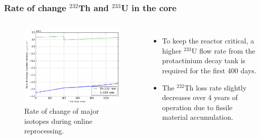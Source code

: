 \begin{frame}
  \frametitle{Rate of change $^{232}$Th and $^{233}$U in the core}
    \begin{columns}
    \column[t]{7.5cm}
   \vspace{-0.35in}
  \begin{figure}[t]
   \includegraphics[height=0.75\textheight]{./images/rates_fuel.png}
   \vspace{-0.05in}
   \caption{Rate of change of major isotopes during online reprocessing.}
    \end{figure}

    \column[t]{4.5cm}
       \begin{itemize}
        \item To keep the reactor critical, a higher $^{233}$U flow rate from the protactinium decay tank is required for
the first 400 days.
        \item The $^{232}$Th loss rate slightly decreases over 4 years of operation due to fissile material accumulation.
       \end{itemize}
     \end{columns}
\end{frame}

